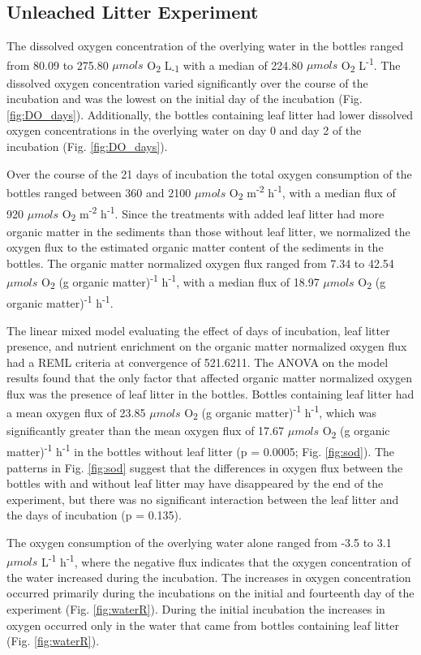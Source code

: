 \subsection{Unleached Litter Experiment}
The dissolved oxygen concentration of the overlying water in the bottles ranged from 80.09 to 275.80 $\mu mols$ O\textsubscript{2} L\textsubscript{-1} with a median of 224.80 $\mu mols$ O\textsubscript{2} L\textsuperscript{-1}.  The dissolved oxygen concentration varied significantly over the course of the incubation and was the lowest on the initial day of the incubation (Fig. \ref{fig:DO_days}). Additionally, the bottles containing leaf litter had lower dissolved oxygen concentrations in the overlying water on day 0 and day 2 of the incubation (Fig. \ref{fig:DO_days}).

Over the course of the 21 days of incubation the total oxygen consumption of the bottles ranged between 360 and 2100 $\mu mols$ O\textsubscript{2} m\textsuperscript{-2} h\textsuperscript{-1}, with a median flux of 920 $\mu mols$ O\textsubscript{2} m\textsuperscript{-2} h\textsuperscript{-1}. Since the treatments with added leaf litter had more organic matter in the sediments than those without leaf litter, we normalized the oxygen flux to the estimated organic matter content of the sediments in the bottles. The organic matter normalized oxygen flux ranged from 7.34 to 42.54 $\mu mols$ O\textsubscript{2} (g organic matter)\textsuperscript{-1} h\textsuperscript{-1}, with a median flux of 18.97 $\mu mols$ O\textsubscript{2} (g organic matter)\textsuperscript{-1} h\textsuperscript{-1}.

The linear mixed model evaluating the effect of days of incubation, leaf litter presence, and nutrient enrichment on the organic matter normalized oxygen flux had a REML criteria at convergence of 521.6211. The ANOVA on the model results found that the only factor that affected organic matter normalized oxygen flux was the presence of leaf litter in the bottles. Bottles containing leaf litter had a mean oxygen flux of 23.85 $\mu mols$ O\textsubscript{2} (g organic matter)\textsuperscript{-1} h\textsuperscript{-1}, which was significantly greater than the mean oxygen flux of 17.67 $\mu mols$ O\textsubscript{2} (g organic matter)\textsuperscript{-1} h\textsuperscript{-1} in the bottles without leaf litter (p = 0.0005; Fig. \ref{fig:sod}). The patterns in Fig. \ref{fig:sod} suggest that the differences in oxygen flux between the bottles with and without leaf litter may have disappeared by the end of the experiment, but there was no significant interaction between the leaf litter and the days of incubation (p = 0.135).

The oxygen consumption of the overlying water alone ranged from -3.5 to 3.1 $\mu mols$ L\textsuperscript{-1} h\textsuperscript{-1}, where the negative flux indicates that the oxygen concentration of the water increased during the incubation.  The increases in oxygen concentration occurred primarily during the incubations on the initial and fourteenth day of the experiment (Fig. \ref{fig:waterR}). During the initial incubation the increases in oxygen occurred only in the water that came from bottles containing leaf litter (Fig. \ref{fig:waterR}).




    
